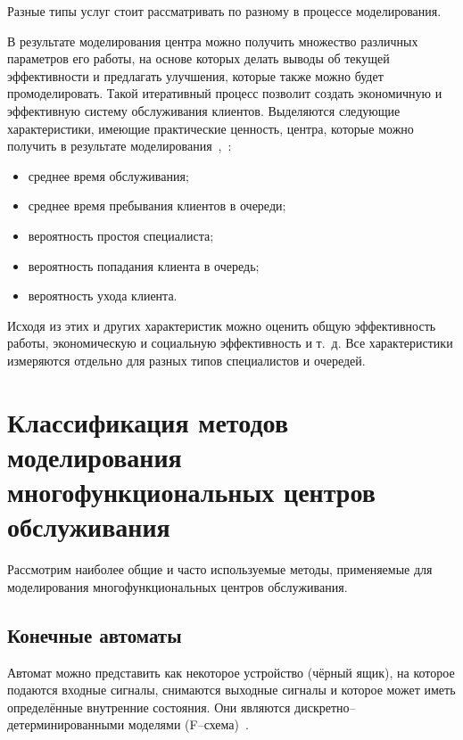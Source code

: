 Разные типы услуг стоит рассматривать по разному в процессе моделирования.

В результате моделирования центра можно получить множество различных параметров его работы, на основе которых делать выводы об текущей эффективности и предлагать улучшения, которые также можно будет промоделировать. Такой итеративный процесс позволит создать экономичную и эффективную систему обслуживания клиентов. Выделяются следующие характеристики, имеющие практические ценность, центра, которые можно получить в результате моделирования~\cite{har1},~\cite{har2}:
\begin{itemize}[label=---]
	\item среднее время обслуживания;
	\item среднее время пребывания клиентов в очереди;
	\item вероятность простоя специалиста;
	\item вероятность попадания клиента в очередь;
	\item вероятность ухода клиента.
\end{itemize}

Исходя из этих и других характеристик можно оценить общую эффективность работы, экономическую и социальную эффективность и т.~д. Все характеристики измеряются отдельно для разных типов специалистов и очередей. 

\section[Классификация методов моделирования\\многофункциональных центров обслуживания]{Классификация методов моделирования\\многофункциональных центров\\обслуживания}

Рассмотрим наиболее общие и часто используемые методы, применяемые для моделирования многофункциональных центров обслуживания.

\subsection{Конечные автоматы}

Автомат можно представить как некоторое устройство (чёрный ящик), на которое подаются входные сигналы, снимаются выходные сигналы и которое может иметь определённые внутренние состояния. Они являются дискретно--детерминированными моделями (F--схема)~\cite{ak_det}.

